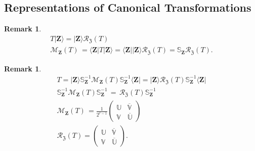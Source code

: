\documentclass[aps, preprint]{revtex4}
\newtheorem{remark}[theorem]{Remark}
\begin{document}
\subsection{Representations of Canonical Transformations}
\begin{remark}
\begin{gather}T\vert \mathbf{Z} \rangle  =\vert \mathbf{Z} \rangle \mathcal{R}_{\mathfrak{Z}} \left (T\right ) \\
\mathcal{M}_{\mathbf{Z}} \left (T\right )\, = \langle \mathbf{Z}\vert T\vert \mathbf{Z} \rangle  = \langle \mathbf{Z}\vert \vert \mathbf{Z} \rangle \mathcal{R}_{\mathfrak{Z}} \left (T\right ) =\mathbb{S}_{\mathbf{Z}} \mathcal{R}_{\mathfrak{Z}} \left (T\right )\text{.}\end{gather}
\end{remark}


\begin{remark}
\begin{gather}T =\vert \mathbf{Z} \rangle \mathbb{S}_{\mathbf{Z}}^{ -1} \mathcal{M}_{\mathbf{Z}} \left (T\right ) \mathbb{S}_{\mathbf{Z}}^{ -1} \langle \mathbf{Z}\vert  =\vert \mathbf{Z} \rangle \mathcal{R}_{\mathfrak{Z}} \left (T\right ) \mathbb{S}_{\mathbf{Z}}^{ -1} \langle \mathbf{Z}\vert  \\
\mathbb{S}_{\mathbf{Z}}^{ -1} \mathcal{M}_{\mathbf{Z}} \left (T\right ) \mathbb{S}_{\mathbf{Z}}^{ -1}\, =\,\mathcal{R}_{\mathfrak{Z}} \left (T\right ) \mathbb{S}_{\mathbf{Z}}^{ -1} \\
\mathcal{M}_{\mathbf{Z}} \left (T\right )\, =\frac{1}{2^{r -1}} \left (\begin{array}{cc}\mathbb{U} & \overline{\mathbb{V}} \\
\mathbb{V} & \overline{\mathbb{U}}\end{array}\right ) \\
\mathcal{R}_{\mathfrak{Z}} \left (T\right ) =\left (\begin{array}{cc}\mathbb{U} & \overline{\mathbb{V}} \\
\mathbb{V} & \overline{\mathbb{U}}\end{array}\right )\text{.}\end{gather}
\end{remark}
\end{document}
